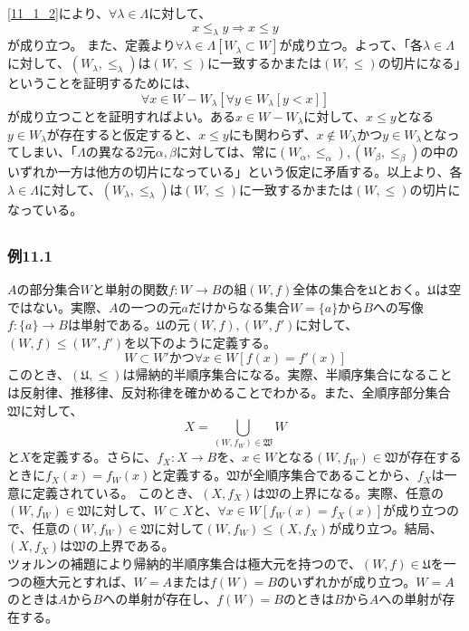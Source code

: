 \documentclass{jsarticle}
\begin{document}
\subsubsection{}
\ref{11_1_2}により、$\forall\lambda\in\Lambda$に対して、\[x\leq_\lambda y\Longrightarrow x\leq y\]が成り立つ。
また、定義より$\forall \lambda\in\Lambda[W_\lambda\subset W]$が成り立つ。よって、「各$\lambda\in\Lambda$に対して、$(W_\lambda,\leq_\lambda)$は$(W,\leq)$に一致するかまたは$(W,\leq)$の切片になる」ということを証明するためには、
\[\forall x\in W-W_\lambda[\forall y\in W_\lambda[y<x]]\]
が成り立つことを証明すればよい。ある$x\in W-W_\lambda$に対して、$x\leq y$となる$y\in W_\lambda$が存在すると仮定すると、$x\leq y$にも関わらず、$x\notin W_\lambda$かつ$y\in W_\lambda$となってしまい、「$\Lambda$の異なる2元$\alpha,\beta$に対しては、常に$(W_\alpha,\leq_\alpha),(W_\beta,\leq_\beta)$の中のいずれか一方は他方の切片になっている」という仮定に矛盾する。以上より、各$\lambda\in\Lambda$に対して、$(W_\lambda,\leq_\lambda)$は$(W,\leq)$に一致するかまたは$(W,\leq)$の切片になっている。

\subsection{}
\subsubsection{例11.1}
$A$の部分集合$W$と単射の関数$f:W\to B$の組$(W,f)$全体の集合を$\mathfrak{U}$とおく。$\mathfrak{U}$は空ではない。実際、$A$の一つの元$a$だけからなる集合$W=\{a\}$から$B$への写像$f:\{a\}\to B$は単射である。$\mathfrak{U}$の元$(W,f),(W',f')$に対して、$(W,f)\leq (W',f')$を以下のように定義する。
\[ W\subset W' かつ \forall x\in W[f(x)=f'(x)]\]
このとき、$(\mathfrak{U},\leq)$は帰納的半順序集合になる。実際、半順序集合になることは反射律、推移律、反対称律を確かめることでわかる。また、全順序部分集合$\mathfrak{W}$に対して、\[X=\bigcup_{(W,f_W)\in \mathfrak{W}}W\]と$X$を定義する。さらに、$f_X:X\to B$を、$x\in W$となる$(W,f_W)\in\mathfrak{W}$が存在するときに$f_X(x)=f_W(x)$と定義する。$\mathfrak{W}$が全順序集合であることから、$f_X$は一意に定義されている。
このとき、$(X,f_X)$は$\mathfrak{W}$の上界になる。実際、任意の$(W,f_W)\in\mathfrak{W}$に対して、$W\subset X$と、$\forall x\in W[f_W(x)=f_X(x)]$が成り立つので、任意の$(W,f_W)\in\mathfrak{W}$に対して$(W,f_W)\leq (X,f_X)$が成り立つ。結局、$(X,f_X)$は$\mathfrak{W}$の上界である。\\
ツォルンの補題により帰納的半順序集合は極大元を持つので、$(W,f)\in\mathfrak{U}$を一つの極大元とすれば、$W=A$または$f(W)=B$のいずれかが成り立つ。$W=A$のときは$A$から$B$への単射が存在し、$f(W)=B$のときは$B$から$A$への単射が存在する。
\end{document}
